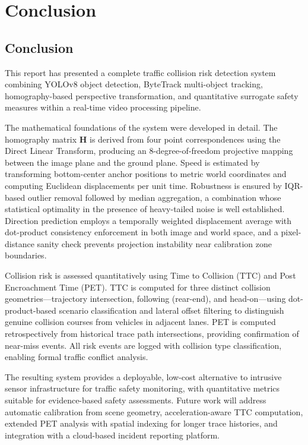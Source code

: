 \documentclass[12pt]{report}
\begin{document}
\chapter{Conclusion}

\section{Conclusion}

This report has presented a complete traffic collision risk detection system combining YOLOv8 object detection, ByteTrack multi-object tracking, homography-based perspective transformation, and quantitative surrogate safety measures within a real-time video processing pipeline.

The mathematical foundations of the system were developed in detail.
The homography matrix $\mathbf{H}$ is derived from four point correspondences using the Direct Linear Transform, producing an $8$-degree-of-freedom projective mapping between the image plane and the ground plane.
Speed is estimated by transforming bottom-center anchor positions to metric world coordinates and computing Euclidean displacements per unit time.
Robustness is ensured by IQR-based outlier removal followed by median aggregation, a combination whose statistical optimality in the presence of heavy-tailed noise is well established.
Direction prediction employs a temporally weighted displacement average with dot-product consistency enforcement in both image and world space, and a pixel-distance sanity check prevents projection instability near calibration zone boundaries.

Collision risk is assessed quantitatively using Time to Collision (TTC) and Post Encroachment Time (PET).
TTC is computed for three distinct collision geometries---trajectory intersection, following (rear-end), and head-on---using dot-product-based scenario classification and lateral offset filtering to distinguish genuine collision courses from vehicles in adjacent lanes.
PET is computed retrospectively from historical trace path intersections, providing confirmation of near-miss events.
All risk events are logged with collision type classification, enabling formal traffic conflict analysis.

The resulting system provides a deployable, low-cost alternative to intrusive sensor infrastructure for traffic safety monitoring, with quantitative metrics suitable for evidence-based safety assessments.
Future work will address automatic calibration from scene geometry, acceleration-aware TTC computation, extended PET analysis with spatial indexing for longer trace histories, and integration with a cloud-based incident reporting platform.
\end{document}
